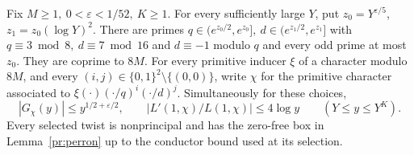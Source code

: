 \begin{theorem}\label{pr:pair}
Fix \(M\ge1,\ 0<\varepsilon<1/52,\ K\ge1\). For every sufficiently
large \(Y\), put \(z_0=Y^{\varepsilon/5}\), \(z_1=z_0(\log Y)^2\).
There are primes \(q\in(e^{z_0/2},e^{z_0}],\
d\in(e^{z_1/2},e^{z_1}]\) with \(q\equiv3\bmod8,\ d\equiv7\bmod16\)
and \(d\equiv-1\) modulo \(q\) and every odd prime at most \(z_0\).
They are coprime to \(8M\). For every primitive inducer \(\xi\) of a
character modulo \(8M\), and every \((i,j)\in\{0,1\}^2\setminus\{(0,0)\}\),
write \(\chi\) for the primitive character associated to
\(\xi(\cdot)(\cdot/q)^i(\cdot/d)^j\). Simultaneously for these choices,
\[
 |G_\chi(y)|\le y^{1/2+\varepsilon/2},\qquad
 |L'(1,\chi)/L(1,\chi)|\le4\log y\qquad(Y\le y\le Y^K).
\]
Every selected twist is nonprincipal and has the zero-free box in
Lemma~\ref{pr:perron} up to the conductor bound used at its selection.
\end{theorem}
